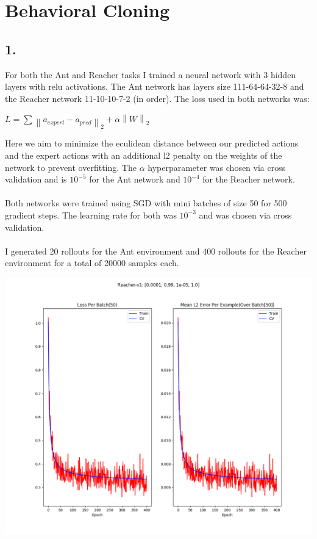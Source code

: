 \documentclass[12pt]{report}
\newcommand{\norm}[1]{\left\lVert #1 \right\rVert}
\begin{document}
\section*{Behavioral Cloning}
\subsection*{1.}
For both the Ant and Reacher tasks I trained a neural network with 3 hidden layers with relu activations. The Ant network has layers size 111-64-64-32-8 and the Reacher network 11-10-10-7-2 (in order). The loss used in both networks was:
\begin{center}
$L=\sum \norm{a_{expert}-a_{pred}}_2 + \alpha \norm{W}_2$
\end{center}
Here we aim to minimize the eculidean distance between our predicted actions and the expert actions with an additional l2 penalty on the weights of the network to prevent overfitting. The $\alpha$ hyperparameter was chosen via cross validation and is $10^{-5}$ for the Ant network and $10^{-4}$ for the Reacher network.\\ \\
Both networks were trained using SGD with mini batches of size 50 for 500 gradient steps. The learning rate for both was $10^{-3}$ and was chosen via cross validation.\\
\\
I generated 20 rollouts for the Ant environment and 400 rollouts for the Reacher environment for a total of 20000 samples each.\\
\newpage
\begin{center}
\includegraphics[scale=.6]{./images/reacher_train_summary.png}
\end{center}
\end{document}

